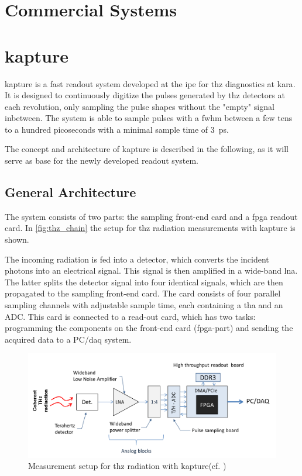 \section{Commercial Systems}


\section{\gls{kapture}}
\Gls{kapture} is a fast readout system developed at the \Gls{ipe} for \Gls{thz} diagnostics at \gls{kara}. It is designed to continuously digitize the pulses generated by \Gls{thz} detectors at each revolution, only sampling the pulse shapes without the "empty" signal inbetween. The system is able to sample pulses with a \gls{fwhm} between a few tens to a hundred picoseconds with a minimal sample time of \SI{3}{\pico \second}. \cite{caselleKAP}

The concept and architecture of \gls{kapture} is described in the following, as it will serve as base for the newly developed readout system. 

\subsection{General Architecture}
The system consists of two parts: the sampling front-end card and a \gls{fpga} readout card. In \autoref{fig:thz_chain} the setup for \gls{thz} radiation measurements with \gls{kapture} is shown. 

The incoming radiation is fed into a detector, which converts the incident photons into an electrical signal. This signal is then amplified in a wide-band \gls{lna}. The latter splits the detector signal into four identical signals, which are then propagated to the sampling front-end card. The card consists of four parallel sampling channels with adjustable sample time, each containing a \gls{tha} and an ADC. This card is connected to a read-out card, which has two tasks: programming the components on the front-end card (\gls{fpga}-part) and sending the acquired data to a PC/\gls{daq} system. \cite{caselle2014}

\begin{figure}[tbh]
	\centering
	\includegraphics[width = \textwidth]{chap/03-currentStat/img/thz_chain}
	\caption[THz measurement]{Measurement setup for \gls{thz} radiation with \gls{kapture}(cf. \cite{caselle2014})}
	\label{fig:thz_chain}
\end{figure}

